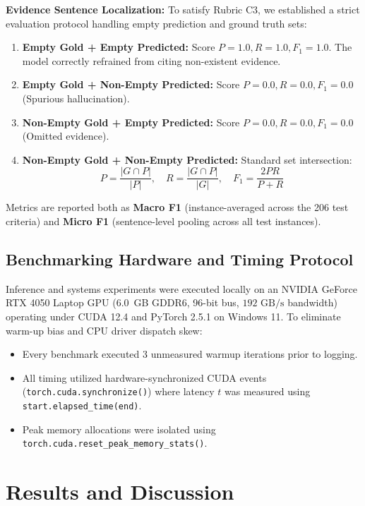 \documentclass[conference]{IEEEtran}
\begin{document}
\textbf{Evidence Sentence Localization:} To satisfy Rubric C3, we established a strict evaluation protocol handling empty prediction and ground truth sets:
\begin{enumerate}
    \item \textbf{Empty Gold + Empty Predicted:} Score $P=1.0, R=1.0, F_1=1.0$. The model correctly refrained from citing non-existent evidence.
    \item \textbf{Empty Gold + Non-Empty Predicted:} Score $P=0.0, R=0.0, F_1=0.0$ (Spurious hallucination).
    \item \textbf{Non-Empty Gold + Empty Predicted:} Score $P=0.0, R=0.0, F_1=0.0$ (Omitted evidence).
    \item \textbf{Non-Empty Gold + Non-Empty Predicted:} Standard set intersection:
    \begin{equation}
        P = \frac{|G \cap P|}{|P|}, \quad R = \frac{|G \cap P|}{|G|}, \quad F_1 = \frac{2 P R}{P + R}
    \end{equation}
\end{enumerate}
Metrics are reported both as \textbf{Macro F1} (instance-averaged across the 206 test criteria) and \textbf{Micro F1} (sentence-level pooling across all test instances).

\subsection{Benchmarking Hardware and Timing Protocol}
Inference and systems experiments were executed locally on an NVIDIA GeForce RTX 4050 Laptop GPU (6.0~GB GDDR6, 96-bit bus, $192\text{ GB/s}$ bandwidth) operating under CUDA 12.4 and PyTorch 2.5.1 on Windows 11. To eliminate warm-up bias and CPU driver dispatch skew:
\begin{itemize}
    \item Every benchmark executed 3 unmeasured warmup iterations prior to logging.
    \item All timing utilized hardware-synchronized CUDA events (\texttt{torch.cuda.synchronize()}) where latency $t$ was measured using \texttt{start.elapsed\_time(end)}.
    \item Peak memory allocations were isolated using \texttt{torch.cuda.reset\_peak\_memory\_stats()}.
\end{itemize}

\section{Results and Discussion}
\label{sec:results}
\end{document}
